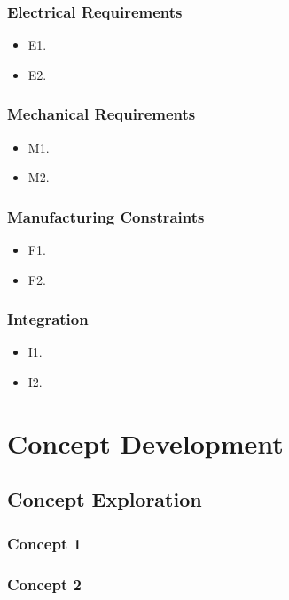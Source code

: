 \documentclass[10pt]{article}
\begin{document}
\subsubsection{Electrical Requirements}
\begin{itemize}[leftmargin=*]
    \item E1.
    \item E2.
\end{itemize}

\subsubsection{Mechanical Requirements}
\begin{itemize}[leftmargin=*]
    \item M1.
    \item M2.
\end{itemize}

\subsubsection{Manufacturing Constraints}
\begin{itemize}[leftmargin=*]
    \item F1.
    \item F2.
\end{itemize}

\subsubsection{Integration}
\begin{itemize}[leftmargin=*]
    \item I1.
    \item I2.
\end{itemize}

\section{Concept Development}
\subsection{Concept Exploration}
\subsubsection{Concept 1}

\subsubsection{Concept 2}
\end{document}
